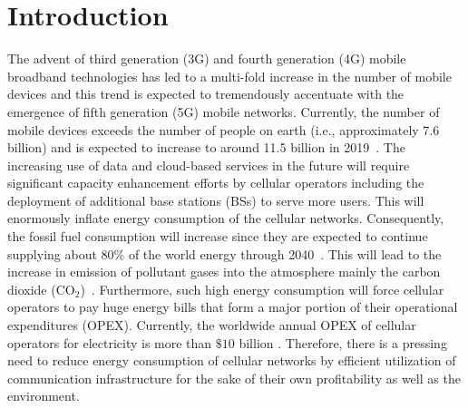 \documentclass[10pt, letter, twocolumn]{IEEEtran}
\begin{document}
\section{Introduction}
The advent of third generation (3G) and fourth generation (4G) mobile broadband technologies has led to a multi-fold increase in the number of mobile devices and this trend is expected to tremendously accentuate with the emergence of fifth generation (5G) mobile networks. Currently, the number of mobile devices exceeds the number of people on earth (i.e., approximately 7.6 billion) and is expected to increase to around 11.5 billion in 2019~\cite{cisco_report}. The increasing use of data and cloud-based services in the future will require significant capacity enhancement efforts by cellular operators including the deployment of additional base stations (BSs) to serve more users. This will enormously inflate energy consumption of the cellular networks. Consequently, the fossil fuel consumption will increase since they are expected to continue supplying about 80\% of the world energy through 2040~\cite{weo}. This will lead to the increase in emission of pollutant gases into the atmosphere mainly the carbon dioxide (CO$_2$)~\cite{ericsson_report,7570259}. Furthermore, such high energy consumption will force cellular operators to pay huge energy bills that form a major portion of their operational expenditures (OPEX). Currently, the worldwide annual OPEX of cellular operators for electricity is more than $\$10$ billion \cite{energy_efficiency_need}. Therefore, there is a pressing need to reduce energy consumption of cellular networks by efficient utilization of communication infrastructure for the sake of their own profitability as well as the environment.
\end{document}
